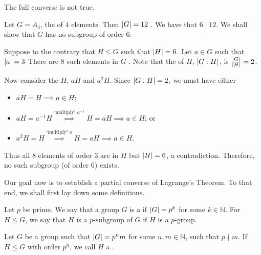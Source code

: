 \documentclass[notoc,notitlepage]{tufte-book}
\begin{document}
The full converse is not true.

\begin{eg}
  Let $G = A_4$, the  of $4$ elements. Then $\left|G\right|
  = 12$ . We have
  that $6 \mid 12$. We shall show that $G$ has no subgroup of order $6$.

  Suppose to the contrary that $H \leq G$ such that $\left|H\right| = 6$. Let $a \in G$
  such that $\left|a\right| = 3$  There are $8$ such elements in $G$ . Note that the  of $H$, $\left|G : H\right|$, is
  $\frac{\left|G\right|}{\left|H\right|} = 2$.

  Now consider the  $H$, $aH$ and $a^2 H$. Since $\left|G : H\right| =
  2$, we must have either
  \begin{itemize}
    \item $aH = H \implies a \in H$;
    \item $aH = a^{-1}H \overset{\text{`multiply' } a^{-1}}{\implies} H = aH \implies a \in H$; or
    \item $a^2H = H \overset{\text{`multiply' } a}{\implies} H = aH \implies a \in H$.
  \end{itemize}
  Thus all $8$ elements of order $3$ are in $H$ but $\left|H\right| = 6$, a
  contradiction. Therefore, no such subgroup (of order $6$) exists.
\end{eg}

Our goal now is to establish a partial converse of Lagrange's Theorem. To that
end, we shall first lay down some definitions.

\begin{defn}[$p$-Group]\label{defn:_p_group}
  Let $p$ be prime. We say that a group $G$ is a  if $\left|G\right|
  = p^k$ for some $k \in \mathbb{N}$. For $H \leq G$, we say that $H$ is a
  $p$-subgroup of $G$ if $H$ is a $p$-group.
\end{defn}

\begin{defn}\label{defn:sylow_p_subgroup}
  Let $G$ be a group such that $\left|G\right| = p^n m$ for some $n, m \in \mathbb{N}$,
  such that $p \nmid m$. If $H \leq G$ with order $p^n$, we call $H$ a
  .
\end{defn}
\end{document}
